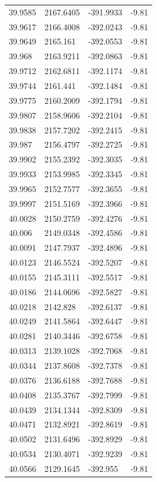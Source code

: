 \begin{table}[H]
\begin{tabular}{llll}
39.9585 & 2167.6405 & -391.9933 & -9.81 \\
39.9617 & 2166.4008 & -392.0243 & -9.81 \\
39.9649 & 2165.161 & -392.0553 & -9.81 \\
39.968 & 2163.9211 & -392.0863 & -9.81 \\
39.9712 & 2162.6811 & -392.1174 & -9.81 \\
39.9744 & 2161.441 & -392.1484 & -9.81 \\
39.9775 & 2160.2009 & -392.1794 & -9.81 \\
39.9807 & 2158.9606 & -392.2104 & -9.81 \\
39.9838 & 2157.7202 & -392.2415 & -9.81 \\
39.987 & 2156.4797 & -392.2725 & -9.81 \\
39.9902 & 2155.2392 & -392.3035 & -9.81 \\
39.9933 & 2153.9985 & -392.3345 & -9.81 \\
39.9965 & 2152.7577 & -392.3655 & -9.81 \\
39.9997 & 2151.5169 & -392.3966 & -9.81 \\
40.0028 & 2150.2759 & -392.4276 & -9.81 \\
40.006 & 2149.0348 & -392.4586 & -9.81 \\
40.0091 & 2147.7937 & -392.4896 & -9.81 \\
40.0123 & 2146.5524 & -392.5207 & -9.81 \\
40.0155 & 2145.3111 & -392.5517 & -9.81 \\
40.0186 & 2144.0696 & -392.5827 & -9.81 \\
40.0218 & 2142.828 & -392.6137 & -9.81 \\
40.0249 & 2141.5864 & -392.6447 & -9.81 \\
40.0281 & 2140.3446 & -392.6758 & -9.81 \\
40.0313 & 2139.1028 & -392.7068 & -9.81 \\
40.0344 & 2137.8608 & -392.7378 & -9.81 \\
40.0376 & 2136.6188 & -392.7688 & -9.81 \\
40.0408 & 2135.3767 & -392.7999 & -9.81 \\
40.0439 & 2134.1344 & -392.8309 & -9.81 \\
40.0471 & 2132.8921 & -392.8619 & -9.81 \\
40.0502 & 2131.6496 & -392.8929 & -9.81 \\
40.0534 & 2130.4071 & -392.9239 & -9.81 \\
40.0566 & 2129.1645 & -392.955 & -9.81 \\

\end{tabular}
\end{table}
